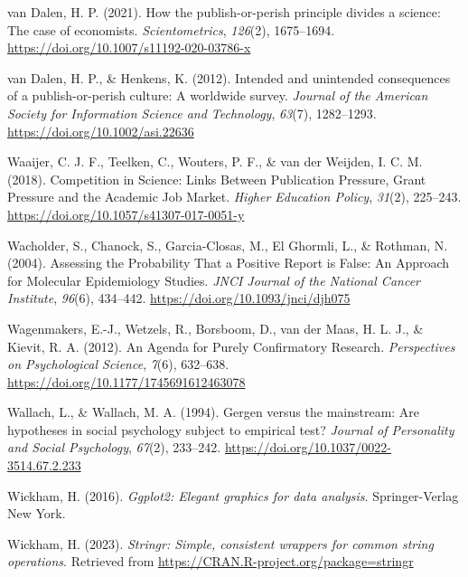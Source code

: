\documentclass[
  ,man,mask,floatsintext]{apa6}
\newlength{\cslhangindent}
\newlength{\cslentryspacingunit} %
\newenvironment{CSLReferences}[2] %
 {%
  \setlength{\parindent}{0pt}
  \ifodd #1
  \let\oldpar\par
  \def\par{\hangindent=\cslhangindent\oldpar}
  \fi
  \setlength{\parskip}{#2\cslentryspacingunit}
 }%
 {}
\begin{document}
\begin{CSLReferences}{1}{0}
\leavevmode{}%
van Dalen, H. P. (2021). How the publish-or-perish principle divides a science: The case of economists. \emph{Scientometrics}, \emph{126}(2), 1675--1694. \url{https://doi.org/10.1007/s11192-020-03786-x}

\leavevmode{}%
van Dalen, H. P., \& Henkens, K. (2012). Intended and unintended consequences of a publish-or-perish culture: {A} worldwide survey. \emph{Journal of the American Society for Information Science and Technology}, \emph{63}(7), 1282--1293. \url{https://doi.org/10.1002/asi.22636}

\leavevmode{}%
Waaijer, C. J. F., Teelken, C., Wouters, P. F., \& van der Weijden, I. C. M. (2018). Competition in {Science}: {Links Between Publication Pressure}, {Grant Pressure} and the {Academic Job Market}. \emph{Higher Education Policy}, \emph{31}(2), 225--243. \url{https://doi.org/10.1057/s41307-017-0051-y}

\leavevmode{}%
Wacholder, S., Chanock, S., Garcia-Closas, M., El Ghormli, L., \& Rothman, N. (2004). Assessing the {Probability That} a {Positive Report} is {False}: {An Approach} for {Molecular Epidemiology Studies}. \emph{JNCI Journal of the National Cancer Institute}, \emph{96}(6), 434--442. \url{https://doi.org/10.1093/jnci/djh075}

\leavevmode{}%
Wagenmakers, E.-J., Wetzels, R., Borsboom, D., van der Maas, H. L. J., \& Kievit, R. A. (2012). An {Agenda} for {Purely Confirmatory Research}. \emph{Perspectives on Psychological Science}, \emph{7}(6), 632--638. \url{https://doi.org/10.1177/1745691612463078}

\leavevmode{}%
Wallach, L., \& Wallach, M. A. (1994). Gergen versus the mainstream: {Are} hypotheses in social psychology subject to empirical test? \emph{Journal of Personality and Social Psychology}, \emph{67}(2), 233--242. \url{https://doi.org/10.1037/0022-3514.67.2.233}

\leavevmode{}%
Wickham, H. (2016). \emph{Ggplot2: {Elegant} graphics for data analysis}. Springer-Verlag New York.

\leavevmode{}%
Wickham, H. (2023). \emph{Stringr: Simple, consistent wrappers for common string operations}. Retrieved from \url{https://CRAN.R-project.org/package=stringr}


\end{CSLReferences}
\end{document}
